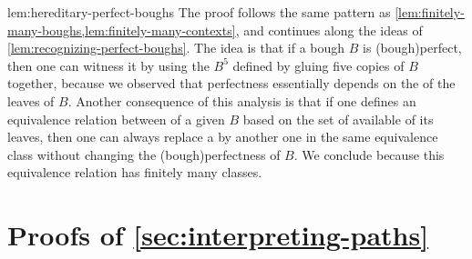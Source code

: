 \begin{proofof}{lem:hereditary-perfect-boughs}
  The proof follows the same pattern 
  as \cref{lem:finitely-many-boughs,lem:finitely-many-contexts},
  and continues along the ideas of \cref{lem:recognizing-perfect-boughs}.
  The idea is that if a bough $B$ is \kl(bough){perfect}, then 
  one can witness it by using the  $B^5$ 
  defined by gluing five copies of $B$ together, because we observed
  that perfectness essentially depends on the  of the leaves
  of $B$. 
  Another consequence of this analysis is that if one defines an equivalence relation between
   of a given  $B$ based on the set of 
  available  of its leaves, then 
  one can always replace a  by another one in the same
  equivalence class without changing the \kl(bough){perfectness} of $B$.
  We conclude because this equivalence relation has finitely many classes.
\end{proofof}


\section{Proofs of \cref{sec:interpreting-paths}}

